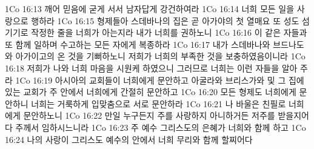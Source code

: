 1Co 16:13  깨어 믿음에 굳게 서서 남자답게 강건하여라
1Co 16:14  너희 모든 일을 사랑으로 행하라
1Co 16:15  형제들아 스데바나의 집은 곧 아가야의 첫 열매요 또 성도 섬기기로 작정한 줄을 너희가 아는지라 내가 너희를 권하노니
1Co 16:16  이 같은 자들과 또 함께 일하며 수고하는 모든 자에게 복종하라
1Co 16:17  내가 스데바나와 브드나도와 아가이고의 온 것을 기뻐하노니 저희가 너희의 부족한 것을 보충하였음이니라
1Co 16:18  저희가 나와 너희 마음을 시원케 하였으니 그러므로 너희는 이런 자들을 알아 주라
1Co 16:19  아시아의 교회들이 너희에게 문안하고 아굴라와 브리스가와 및 그 집에 있는 교회가 주 안에서 너희에게 간절히 문안하고
1Co 16:20  모든 형제도 너희에게 문안하니 너희는 거룩하게 입맞춤으로 서로 문안하라
1Co 16:21  나 바울은 친필로 너희에게 문안하노니
1Co 16:22  만일 누구든지 주를 사랑하지 아니하거든 저주를 받을지어다 주께서 임하시느니라
1Co 16:23  주 예수 그리스도의 은혜가 너희와 함께 하고
1Co 16:24  나의 사랑이 그리스도 예수의 안에서 너희 무리와 함께 할찌어다



